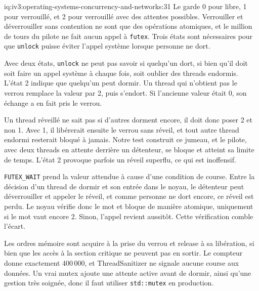 \begin{solution}{iq:iv3:operating-systems-concurrency-and-networks:31}
Le  garde 0 pour libre, 1 pour verrouillé, et 2 pour verrouillé avec des attentes possibles. Verrouiller et déverrouiller sans contention ne sont que des opérations atomiques, et le million de tours du pilote ne fait aucun appel à \texttt{futex}. Trois états sont nécessaires pour que \texttt{unlock} puisse éviter l'appel système lorsque personne ne dort.
\label{lst:iv3:os:futex}

Avec deux états, \texttt{unlock} ne peut pas savoir si quelqu'un dort, si bien qu'il doit soit faire un appel système à chaque fois, soit oublier des threads endormis. L'état 2 indique que quelqu'un peut dormir. Un thread qui n'obtient pas le verrou remplace la valeur par 2, puis s'endort. Si l'ancienne valeur était 0, son échange a en fait pris le verrou.

Un thread réveillé ne sait pas si d'autres dorment encore, il doit donc poser 2 et non 1. Avec 1, il libérerait ensuite le verrou sans réveil, et tout autre thread endormi resterait bloqué à jamais. Notre test construit ce jumeau, et le pilote, avec deux threads en attente derrière un détenteur, se bloque et atteint sa limite de temps. L'état 2 provoque parfois un réveil superflu, ce qui est inoffensif.

\texttt{FUTEX\_WAIT} prend la valeur attendue à cause d'une condition de course. Entre la décision d'un thread de dormir et son entrée dans le noyau, le détenteur peut déverrouiller et appeler le réveil, et comme personne ne dort encore, ce réveil est perdu. Le noyau vérifie donc le mot et bloque de manière atomique, uniquement si le mot vaut encore 2. Sinon, l'appel revient aussitôt. Cette vérification comble l'écart.

Les ordres mémoire sont acquire à la prise du verrou et release à sa libération, si bien que les accès à la section critique ne peuvent pas en sortir. Le compteur donne exactement 400\,000, et ThreadSanitizer ne signale aucune course aux données. Un vrai mutex ajoute une attente active avant de dormir, ainsi qu'une gestion très soignée, donc il faut utiliser \texttt{std::mutex} en production.

\end{solution}

